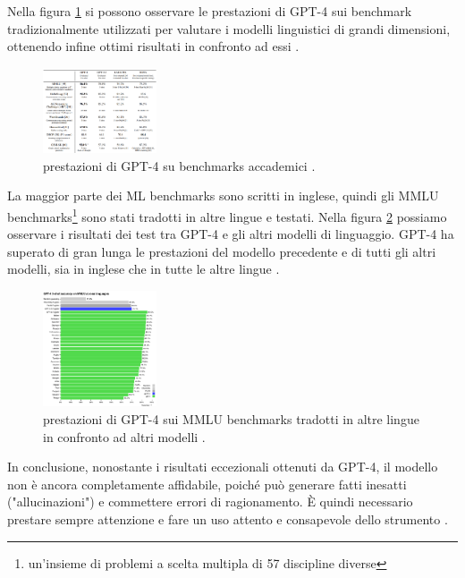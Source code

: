 Nella figura \ref{fig:GPT4-benchmarks} si possono osservare le prestazioni di GPT-4 sui benchmark tradizionalmente utilizzati per valutare i modelli linguistici di grandi dimensioni, ottenendo infine ottimi risultati in confronto ad essi \cite{achiam2023gpt}.\\

\begin{figure}[ht]
	\centering
	\includegraphics[width=0.3\textwidth]{Immagini/GPT-4_benchmarks.png}
	\caption{ prestazioni di GPT-4 su benchmarks accademici \cite{achiam2023gpt}.}
	\label{fig:GPT4-benchmarks}
\end{figure}

La maggior parte dei ML benchmarks sono scritti in inglese, quindi gli MMLU benchmarks\footnote{un'insieme di problemi a scelta multipla di 57 discipline diverse} sono stati tradotti in altre lingue e testati.
Nella figura \ref{fig:GPT4-languages-benchmarks} possiamo osservare i risultati dei test tra GPT-4 e gli altri modelli di linguaggio. GPT-4 ha superato di gran lunga le prestazioni del modello precedente e di tutti gli altri modelli, sia in inglese che in tutte le altre lingue \cite{achiam2023gpt}.

\begin{figure}[ht]
	\centering
	\includegraphics[width=0.3\textwidth]{Immagini/GPT-4_languages_benchmarks.png}
	\caption{ prestazioni di GPT-4 sui MMLU benchmarks tradotti in altre lingue in confronto ad altri modelli \cite{achiam2023gpt}.}
	\label{fig:GPT4-languages-benchmarks}
\end{figure}

In conclusione, nonostante i risultati eccezionali ottenuti da GPT-4, il modello non è ancora completamente affidabile, poiché può generare fatti inesatti ("allucinazioni") e commettere errori di ragionamento. È quindi necessario prestare sempre attenzione e fare un uso attento e consapevole dello strumento \cite{achiam2023gpt}.


